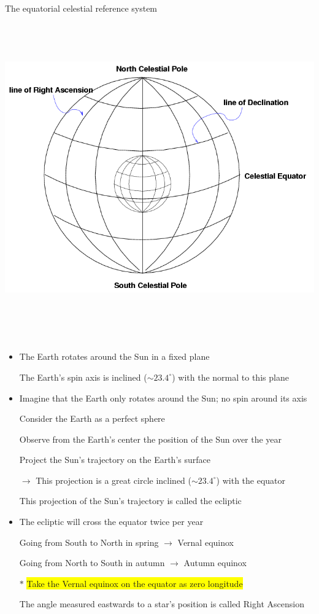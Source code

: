 \Tr
\onecolumn
\begin{center}
{\blue The equatorial celestial reference system}\\[3mm]
\includegraphics[keepaspectratio,height=14cm]{equatorial-ref}
\end{center}

\Tr
\onecolumn
\begin{itemize}
\item The Earth rotates around the Sun in a fixed plane
\item[] The Earth's spin axis is inclined ($\sim 23.4^{\circ}$) with the normal to this plane
\item Imagine that the Earth only rotates around the Sun; no spin around its axis
\item[] Consider the Earth as a perfect sphere
\item[] Observe from the Earth's center the position of the Sun over the year 
\item[] Project the Sun's trajectory on the Earth's surface
\item[] $\rightarrow$ This projection is a great circle inclined ($\sim 23.4^{\circ}$) with the equator
\item[] This projection of the Sun's trajectory is called the {\blue ecliptic}
\item The ecliptic will cross the equator twice per year
\item[] Going from South to North in spring $\rightarrow$ {\blue Vernal equinox}
\item[] Going from North to South in autumn $\rightarrow$ {\blue Autumn equinox}
\item[$\ast$] \colorbox{yellow}{Take the Vernal equinox on the equator as zero longitude}
\item[] The {\blue angle measured eastwards} to a star's position is called {\blue Right Ascension}
\end{itemize}


